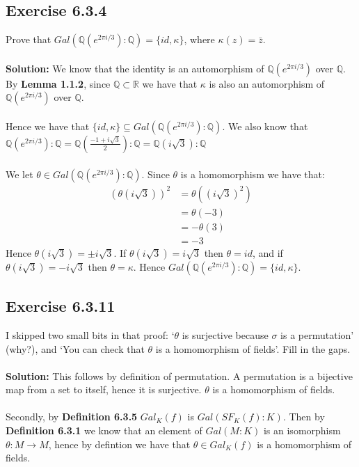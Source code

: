 \documentclass{article}
\begin{document}
\subsection*{Exercise 6.3.4}
Prove that $Gal(\mathbb{Q}(e^{2\pi i /3}):\mathbb{Q}) = \{ id, \kappa\}$, where $\kappa(z)=\bar z$.
\\\\
\textbf{Solution:}
We know that the identity is an automorphism of $\mathbb{Q}(e^{2\pi i /3})$ over $\mathbb{Q}$. 
By \textbf{Lemma 1.1.2}, since $\mathbb{Q} \subset \mathbb{R}$ we have that $\kappa$ is also an automorphism of $\mathbb{Q}(e^{2\pi i /3})$ over $\mathbb{Q}$.
\\\\
Hence we have that $\{ id, \kappa\} \subseteq Gal(\mathbb{Q}(e^{2\pi i /3}):\mathbb{Q})$.
We also know that $\mathbb{Q}(e^{2\pi i /3}):\mathbb{Q} = \mathbb{Q}(\frac{-1+i\sqrt{3}}{2}):\mathbb{Q}=  \mathbb{Q}(i\sqrt{3}):\mathbb{Q}$
\\\\
We let $\theta \in Gal(\mathbb{Q}(e^{2\pi i /3}):\mathbb{Q})$. Since $\theta$ is a homomorphism we have that:
\begin{equation*}
    \begin{aligned}
        (\theta(i\sqrt{3}))^2 &= \theta((i\sqrt{3})^2)\\
        &= \theta(-3)\\
        &= -\theta(3)\\
        &= -3
    \end{aligned}
\end{equation*}
Hence $\theta(i \sqrt{3}) = \pm i\sqrt{3}$. If $\theta(i\sqrt{3}) = i\sqrt{3}$ then $\theta = id$,
and if $\theta(i\sqrt{3}) = -i\sqrt{3}$ then $\theta=\kappa$. Hence $Gal(\mathbb{Q}(e^{2\pi i /3}):\mathbb{Q}) = \{id, \kappa\}$.

\subsection*{Exercise 6.3.11}
I skipped two small bits in that proof: `$\theta$ is surjective because $\sigma$ is a permutation' (why?), and
`You can check that $\theta$ is a homomorphism of fields'. Fill in the gaps.
\\\\
\textbf{Solution:}
This follows by definition of permutation. A permutation is a bijective map from a set to itself, hence it is surjective.
$\theta$ is a homomorphism of fields.
\\\\
Secondly, by \textbf{Definition 6.3.5} $Gal_K(f)$ is $Gal(SF_K(f):K)$. Then by \textbf{Definition 6.3.1} we know that
an element of $Gal(M:K)$ is an isomorphism $\theta:M\rightarrow M$, hence by defintion we have that
$\theta \in Gal_K(f)$ is a homomorphism of fields.
\end{document}
